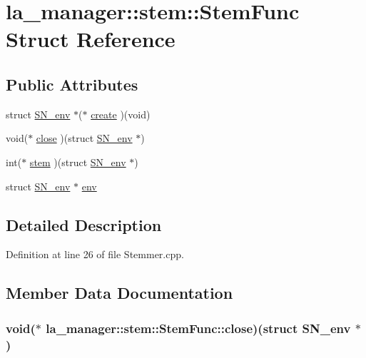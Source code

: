 \hypertarget{structla__manager_1_1stem_1_1StemFunc}{
\section{la\_\-manager::stem::StemFunc Struct Reference}
\label{structla__manager_1_1stem_1_1StemFunc}
}
\subsection*{Public Attributes}
\begin{CompactItemize}
\item 
struct \hyperlink{structSN__env}{SN\_\-env} $\ast$($\ast$ \hyperlink{structla__manager_1_1stem_1_1StemFunc_3b0193fb82ca7e362bee161c2eff6dc4}{create} )(void)
\item 
void($\ast$ \hyperlink{structla__manager_1_1stem_1_1StemFunc_126846e10f2b739f9559de1b280916a2}{close} )(struct \hyperlink{structSN__env}{SN\_\-env} $\ast$)
\item 
int($\ast$ \hyperlink{structla__manager_1_1stem_1_1StemFunc_18a1d0b5aba2b9f7aee822ad02eac0f2}{stem} )(struct \hyperlink{structSN__env}{SN\_\-env} $\ast$)
\item 
struct \hyperlink{structSN__env}{SN\_\-env} $\ast$ \hyperlink{structla__manager_1_1stem_1_1StemFunc_8dfdd0f1367426d19410226cd6d89c6d}{env}
\end{CompactItemize}


\subsection{Detailed Description}


Definition at line 26 of file Stemmer.cpp.

\subsection{Member Data Documentation}
\hypertarget{structla__manager_1_1stem_1_1StemFunc_126846e10f2b739f9559de1b280916a2}{
\subsubsection[{close}]{\setlength{\rightskip}{0pt plus 5cm}void($\ast$ {\bf la\_\-manager::stem::StemFunc::close})(struct {\bf SN\_\-env} $\ast$)}}
\label{structla__manager_1_1stem_1_1StemFunc_126846e10f2b739f9559de1b280916a2}




